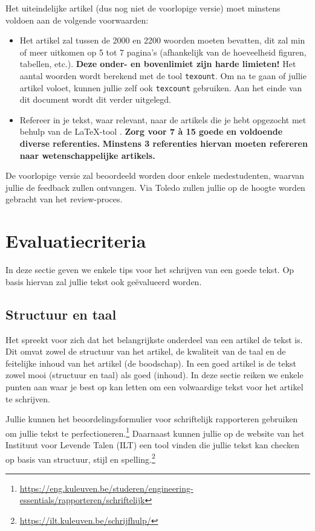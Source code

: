\documentclass[a4paper]{article}
\begin{document}
Het uiteindelijke artikel (dus nog niet de voorlopige versie) moet minstens voldoen aan de volgende voorwaarden:
\begin{itemize}
	\item
		Het artikel zal tussen de 2000 en 2200 woorden moeten bevatten, dit zal min of meer uitkomen op 5 tot 7 pagina's (afhankelijk van de hoeveelheid figuren, tabellen, etc.).
		\textbf{Deze onder- en bovenlimiet zijn harde limieten!}
		Het aantal woorden wordt berekend met de tool \texttt{texount}.
		Om na te gaan of jullie artikel voloet, kunnen jullie zelf ook \texttt{texcount} gebruiken.
		Aan het einde van dit document wordt dit verder uitgelegd.
	\item
		Refereer in je tekst, waar relevant, naar de artikels die je hebt opgezocht met behulp van de \LaTeX{}-tool .
		\textbf{Zorg voor 7 \`a 15 goede en voldoende diverse referenties.}
		\textbf{Minstens 3 referenties hiervan moeten refereren naar wetenschappelijke artikels.}
\end{itemize}

De voorlopige versie zal beoordeeld worden door enkele medestudenten, waarvan jullie de feedback zullen ontvangen.
Via Toledo zullen jullie op de hoogte worden gebracht van het review-proces.


\section{Evaluatiecriteria}

In deze sectie geven we enkele tips voor het schrijven van een goede tekst.
Op basis hiervan zal jullie tekst ook ge\"evalueerd worden.


\subsection{Structuur en taal}

Het spreekt voor zich dat het belangrijkste onderdeel van een artikel de tekst is.
Dit omvat zowel de structuur van het artikel, de kwaliteit van de taal en de feitelijke inhoud van het artikel (de boodschap).
In een goed artikel is de tekst zowel mooi (structuur en taal) als goed (inhoud).
In deze sectie reiken we enkele punten aan waar je best op kan letten om een volwaardige tekst voor het artikel te schrijven.

Jullie kunnen het beoordelingsformulier voor schriftelijk rapporteren gebruiken om jullie tekst te perfectioneren.\footnote{\url{https://eng.kuleuven.be/studeren/engineering-essentials/rapporteren/schriftelijk}}
Daarnaast kunnen jullie op de website van het Instituut voor Levende Talen (ILT) een tool vinden die jullie tekst kan checken op basis van structuur, stijl en spelling.\footnote{\url{https://ilt.kuleuven.be/schrijfhulp/}}
\end{document}

